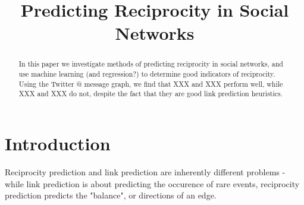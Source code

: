 \documentclass[conference]{IEEEtran}
\begin{document}
\title{Predicting Reciprocity in Social Networks}

\author{
\and
{}
\and
{}
}

\maketitle

\begin{abstract}
In this paper we investigate methods of predicting reciprocity in social networks, and use machine learning (and regression?) to determine good indicators of reciprocity. Using the Twitter @ message graph, we find that XXX and XXX perform well, while XXX and XXX do not, despite the fact that they are good link prediction heuristics.
\end{abstract}


%
\IEEEpeerreviewmaketitle

\section{Introduction}
Reciprocity prediction and link prediction are inherently different problems - while link prediction is about predicting the occurence of rare events, reciprocity prediction predicts the "balance", or directions of an edge.
\end{document}
